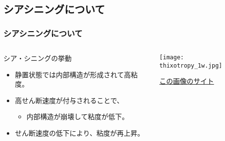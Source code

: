 \documentclass[12pt, dvipdfmx]{beamer}
\begin{document}
\subsection{シアシニングについて}
\begin{frame}
	\frametitle{シアシニングについて}
			\begin{columns}[T, onlytextwidth]
				\begin{exampleblock}{シア・シニングの挙動}
					\begin{itemize}
						\item 静置状態では内部構造が形成されて高粘度。
						\item 高せん断速度が付与されることで、
						\begin{itemize}
							\item 内部構造が崩壊して粘度が低下。
						\end{itemize}
						\item せん断速度の低下により、粘度が再上昇。
					\end{itemize}
				\end{exampleblock}
					\begin{center}
						\texttt{[image: thixotropy\_1w.jpg]}
				
						\href{https://www.kyoeisha.co.jp/product/toryou/antisaggingagentTechnology.php}{この画像のサイト}
					\end{center}
			\end{columns}
		
\end{frame}
\end{document}
